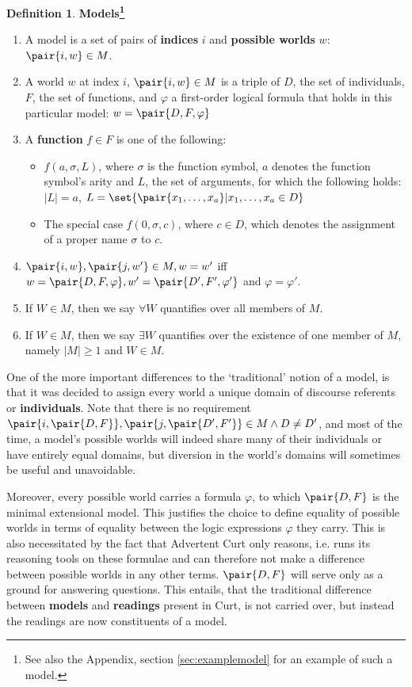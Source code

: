 \documentclass[11pt,a4paper]{article}
\newcommand{\stress}{\textbf} %
\newcommand{\term}[1]{\textsf{\textbf{#1}}} %
\newcommand{\pn}{\textsf} %
\newcommand{\curt}{\pn{Curt}}
\newcommand{\acurt}{\pn{Advertent Curt}}
\theoremstyle{remark}
\theoremstyle{remark}
\theoremstyle{definition}
\newtheorem{definition}[thm]{Definition}
\begin{document}
\begin{definition}\label{Models}
  \stress{Models\footnote{See also the Appendix, section \ref{sec:examplemodel}
  for an example of such a model.}}
  \begin{enumerate}
    \item A model is a set of pairs of \term{indices} $i$ and \term{possible
    worlds} $w$: $\pair{i,w} \in M$. 
    \item A world $w$ at index $i$, $\pair{i,w} \in M$ is a triple of $D$, the set
    of individuals, $F$, the set of functions, and $\varphi$ a first-order
    logical formula that holds in this particular model: $w = \pair{D,F,\varphi}$
    \item A \term{function} $f \in F$ is one of the following: 
    \begin{itemize}
      \item $f(a,\sigma,L)$, where $\sigma$ is the function symbol, $a$ denotes
      the function symbol's arity and $L$, the set of arguments, for which the
      following holds: $|L| = a$,
      $L = \set{\pair{x_1,\ldots{},x_a}|x_1,\ldots{},x_a \in D}$
      \item The special case $f(0,\sigma,c)$, where $c \in D$, which denotes the
      assignment of a proper name $\sigma$ to $c$.
    \end{itemize}
    \item $\pair{i,w}, \pair{j,w'} \in M, w = w'$ iff $w = \pair{D,F,\varphi}, w' =
    \pair{D',F',\varphi'}$ and $\varphi = \varphi'$.
    \item If $W \in M$, then we say $\forall W$ quantifies over all members of $M$.
    \item If $W \in M$, then we say $\exists W$ quantifies over the existence of
    one member of $M$, namely $|M| \geq 1$ and $W \in M$.
  \end{enumerate}
\end{definition}

One of the more important differences to the `traditional' notion of a model, is
that it was decided to assign every world a unique domain of discourse referents
or \term{individuals}. Note that there is no requirement $\pair{i,\pair{D,F}},
\pair{j,\pair{D',F'}} \in M \wedge D\neq D'$, and most of the time, a model's
possible worlds will indeed share many of their individuals or have entirely
equal domains, but diversion in the world's domains will sometimes be useful and
unavoidable.

Moreover, every possible world carries a formula $\varphi$, to which $\pair{D,F}$
is the minimal extensional model. This justifies the choice to define equality
of possible worlds in terms of equality between the logic expressions $\varphi$
they carry. This is also necessitated by the fact that \acurt{}  only reasons,
i.e. runs its reasoning tools on these formulae and can therefore not make a
difference between possible worlds in any other terms. $\pair{D,F}$ will serve
only as a ground for answering questions. This entails, that the traditional
difference between \term{models} and \term{readings} present in \curt, is not
carried over, but instead the readings are now constituents of a model.
\end{document}
